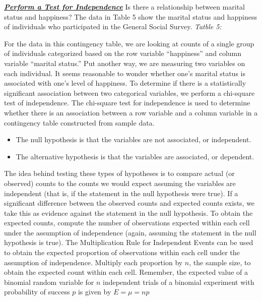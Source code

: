 \documentclass{report}
\begin{document}
    \bigbreak \noindent \bigbreak \noindent 
    \textbf{\textit{\underline{Perform a Test for Independence}}}
    \bigbreak \noindent 
    Is there a relationship between marital status and happiness? The data in Table 5 show the marital status and happiness of individuals who participated in the General Social Survey.
    \bigbreak \noindent 
    \textit{Tatble 5:}
    \begin{figure}[ht]
        \centering
        \label{fig:cici}
    \end{figure}
    \bigbreak \noindent 
    For the data in this contingency table, we are looking at counts of a single group of individuals categorized based on the row variable “happiness” and column variable “marital status.” Put another way, we are measuring two variables on each individual.
    \bigbreak \noindent 
    It seems reasonable to wonder whether one’s marital status is associated with one’s level of happiness.
    \bigbreak \noindent 
    To determine if there is a statistically significant association between two categorical variables, we perform a chi-square test of independence.
    \bigbreak \noindent 
    The chi-square test for independence is used to determine whether there is an association between a row variable and a column variable in a contingency table constructed from sample data.
    \bigbreak \noindent 
    \begin{itemize}
        \item The null hypothesis is that the variables are not associated, or independent.
        \item The alternative hypothesis is that the variables are associated, or dependent.
    \end{itemize}
    \bigbreak \noindent 
    The idea behind testing these types of hypotheses is to compare actual (or observed) counts to the counts we would expect assuming the variables are independent (that is, if the statement in the null hypothesis were true). If a significant difference between the observed counts and expected counts exists, we take this as evidence against the statement in the null hypothesis.
    \bigbreak \noindent 
    To obtain the expected counts, compute the number of observations expected within each cell under the assumption of independence (again, assuming the statement in the null hypothesis is true).
    \bigbreak \noindent 
    The Multiplication Rule for Independent Events can be used to obtain the expected proportion of observations within each cell under the assumption of independence. Multiply each proportion by $n $, the sample size, to obtain the expected count within each cell. Remember, the expected value of a binomial random variable for $n $ independent trials of a binomial experiment with probability of success $p $ is given by $E=\mu=np $
\end{document}
